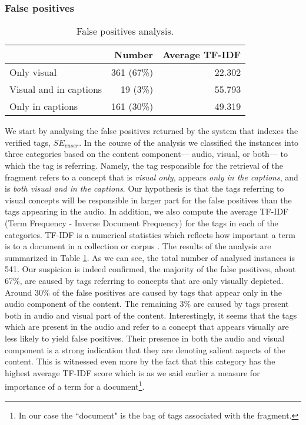 \subsubsection{False positives}

\begin{table}[tb]
\centering
\begin{footnotesize}
\begin{tabular}{l|r|r}
\toprule
 & Number & Average TF-IDF\\
 \hline
Only visual & 361 (67\%)& 22.302\\
\hline
Visual and in captions & 19 (3\%)& 55.793\\
\hline
Only in captions  & 161 (30\%)& 49.319\\
\bottomrule
\end{tabular}
\caption{False positives analysis.}
\label{topicir:table:false-pos}
\end{footnotesize}
\end{table}

We start by analysing the false positives returned by the system that indexes the verified tags, $SE_{vuser}$. In the course of the analysis we classified the instances into three categories based on the content component--- audio, visual, or both--- to which the tag is referring. Namely, the tag responsible for the retrieval of the fragment refers to a concept that is \textit{visual only}, appears \textit{only in the captions}, and is \textit{both visual and in the captions}. Our hypothesis is that the tags referring to visual concepts will be responsible in larger part for the false positives than the tags appearing in the audio. In addition, we also compute the average TF-IDF (Term Frequency - Inverse Document Frequency) for the tags in each of the categories. TF-IDF is a numerical statistics which reflects how important a term is to a document in a collection or corpus \cite{tfidf1,tfidf2}. The results of the analysis are summarized in Table \ref{topicir:table:false-pos}. As we can see, the total number of analysed instances is 541. Our suspicion is indeed confirmed, the majority of the false positives, about 67\%, are caused by tags referring to concepts that are only visually depicted. Around 30\% of the false positives are caused by tags that appear only in the audio component of the content. The remaining 3\% are caused by tags present both in audio and visual part of the content. Interestingly, it seems that the tags which are present in the audio and refer to a concept that appears visually are less likely to yield false positives. Their presence in both the audio and visual component is a strong indication that they are denoting salient aspects of the content. This is witnessed even more by the fact that this category has the highest average TF-IDF score which is as we said earlier a measure for importance of a term for a document\footnote{In our case the ``document" is the bag of tags associated with the fragment.}.

